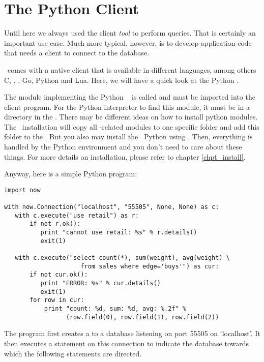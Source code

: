 \section{The Python Client}
Until here we always used the client \emph{tool}
to perform queries.
That is certainly an important use case.
Much more typical, however, is to develop application code
that needs a client  to connect to the database.

\nowdb\ comes with a native client 
that is available in different languages, among others
C, \CC, \csharp, Go, Python and Lua.
Here, we will have a quick look at the Python .

The module implementing the Python \nowdb\ 
is called  and must be imported into the client program.
For the Python interpreter to find this module,
it must be in a directory in the .
There may be different ideas on how to install python modules.
The \nowdb\ installation will copy all \nowdb-related modules
to one specific folder and add this folder to the
. But you also may install
the \nowdb\ Python  using .
Then, everything is handled by the Python environment
and you don't need to care about these things.
For more details on installation, please refer
to chapter \ref{chpt_install}.

Anyway, here is a simple Python program:

\begin{python}
\begin{lstlisting}
import now

with now.Connection("localhost", "55505", None, None) as c:
   with c.execute("use retail") as r:
       if not r.ok():
          print "cannot use retail: %s" % r.details()
          exit(1)

   with c.execute("select count(*), sum(weight), avg(weight) \
                     from sales where edge='buys'") as cur:
       if not cur.ok():
          print "ERROR: %s" % cur.details()
          exit(1)
       for row in cur:
           print "count: %d, sum: %d, avg: %.2f" %
                 (row.field(0), row.field(1), row.field(2))
\end{lstlisting}
\end{python}

The program first creates a 
to a database listening on port 55505 on `localhost'.
It then executes a  statement on this connection
to indicate the database towards which
the following statements are directed.

